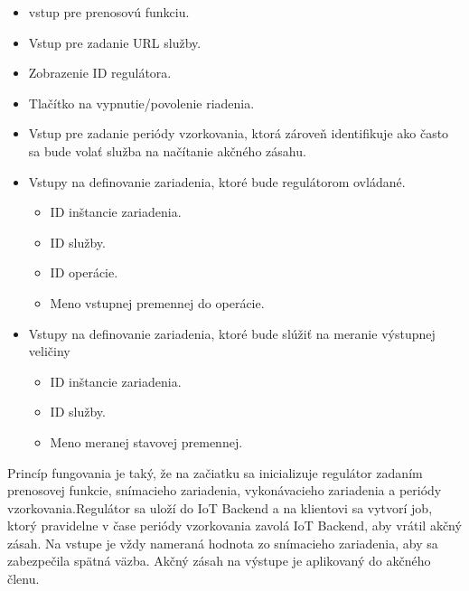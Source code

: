 \begin{itemize}
  \item vstup pre prenosovú funkciu.
  \item Vstup pre zadanie URL služby.
  \item Zobrazenie ID regulátora.
  \item Tlačítko na vypnutie/povolenie riadenia.
  \item Vstup pre zadanie periódy vzorkovania, ktorá zároveň identifikuje ako často sa bude volať služba na načítanie akčného zásahu.
  \item Vstupy na definovanie zariadenia, ktoré bude regulátorom ovládané.  
  \begin{itemize}
    \item ID inštancie zariadenia.
    \item ID služby.    
    \item ID operácie.    
    \item Meno vstupnej premennej do operácie.
  \end{itemize} 
  \item Vstupy na definovanie zariadenia, ktoré bude slúžiť na meranie výstupnej veličiny
  \begin{itemize}
    \item ID inštancie zariadenia.
    \item ID služby.    
    \item Meno meranej stavovej premennej.    
  \end{itemize}     
\end{itemize}
Princíp fungovania je taký, že na začiatku sa inicializuje regulátor zadaním prenosovej funkcie, snímacieho zariadenia, vykonávacieho zariadenia a periódy vzorkovania.Regulátor sa uloží do IoT Backend a na klientovi sa vytvorí job, ktorý pravidelne v čase periódy vzorkovania zavolá IoT Backend, aby vrátil akčný zásah. Na vstupe je vždy nameraná hodnota zo snímacieho zariadenia, aby sa zabezpečila spätná väzba. Akčný zásah na výstupe je aplikovaný do akčného členu.
